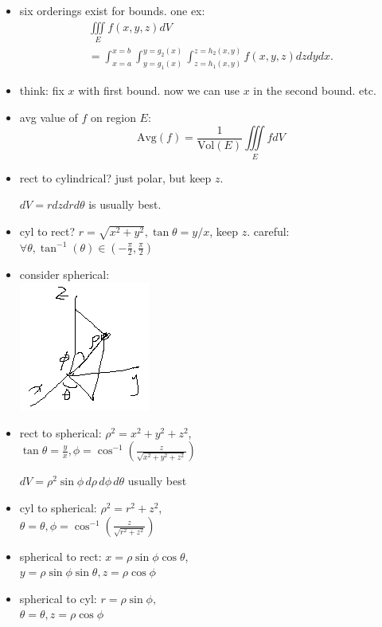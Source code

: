 \documentclass[11pt]{article}
\theoremstyle{definition}
\begin{document}
\begin{multicols}{2}
{\begin{itemize}
      \item six orderings exist for bounds. one ex:
      \begin{gather*}
        \iiint\limits_E f(x,y,z)dV \\
        = \int_{x=a}^{x=b}\int_{y=g_1(x)}^{y=g_2(x)}\int_{z=h_1(x,y)}^{z=h_2(x,y)}f(x,y,z)dzdydx.
      \end{gather*}
      \item think: fix $x$ with first bound. now we can use $x$ in the second bound. etc.
      \item avg value of $f$ on region $E$:
      \[ \text{Avg}(f) = \frac{1}{\text{Vol}(E)}\iiint\limits_E f dV \]
      \item rect to cylindrical? just polar, but keep $z$.
      
      $dV = rdzdrd\theta$ is usually best. 
      \item cyl to rect? $r=\sqrt{x^2+y^2}, \tan\theta = y/x$, keep $z$. careful: $\forall \theta,\tan^{-1}(\theta)\in (-\frac{\pi}{2},\frac{\pi}{2})$
      \item consider spherical:\\
      \includegraphics{spherical_coords.png}
      \item rect to spherical: $\rho^2=x^2+y^2+z^2$,\\ $\tan\theta=\frac{y}{x},\phi=\cos^{-1}(\frac{z}{\sqrt{x^2+y^2+z^2}})$
      
      $dV=\rho^2\sin\phi \,d\rho \,d\phi \,d\theta$ usually best
      \item cyl to spherical: $\rho^2 = r^2 + z^2$,\\ $\theta=\theta, \phi=\cos^{-1}(\frac{z}{\sqrt{r^2+z^2}})$
      \item spherical to rect: $x=\rho\sin\phi\cos\theta$, \\$y=\rho\sin\phi\sin\theta,z=\rho\cos\phi$
      \item spherical to cyl: $r=\rho\sin\phi,$\\$\theta=\theta,z=\rho\cos\phi$
    \end{itemize}
  }
\end{multicols}
\end{document}
